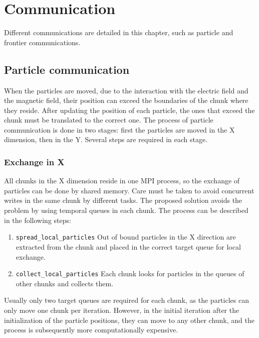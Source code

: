 \chapter{Communication}

Different communications are detailed in this chapter, such as particle and 
frontier communications.

\section{Particle communication}

When the particles are moved, due to the interaction with the electric field and 
the magnetic field, their position can exceed the boundaries of the chunk where 
they reside. After updating the position of each particle, the ones that exceed 
the chunk must be translated to the correct one. The process of particle 
communication is done in two stages: first the particles are moved in the X 
dimension, then in the Y. Several steps are required in each stage.

\subsection{Exchange in X}
All chunks in the X dimension reside in one MPI process, so the exchange of 
particles can be done by shared memory. Care must be taken to avoid concurrent 
writes in the same chunk by different tasks. The proposed solution avoids the 
problem by using temporal queues in each chunk. The process can be described in 
the following steps:
%
\begin{enumerate}
\item \texttt{spread\_local\_particles} Out of bound particles in the X 
direction are extracted from the chunk and placed in the correct target queue 
for local exchange.
\item \texttt{collect\_local\_particles} Each chunk looks for particles in the 
queues of other chunks and collects them.
\end{enumerate}
%
Usually only two target queues are required for each chunk, as the particles can 
only move one chunk per iteration. However, in the initial iteration after the 
initialization of the particle positions, they can move to any other chunk, and 
the process is subsequently more computationally expensive.

